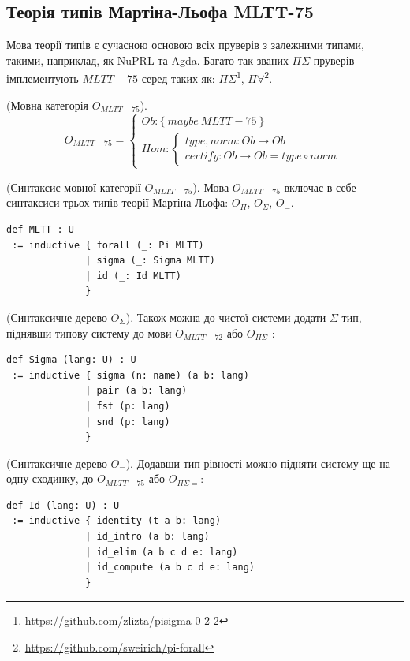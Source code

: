 \newpage
\subsection{Теорія типів Мартіна-Льофа MLTT-75}
Мова теорії типів є сучасною основою всіх пруверів з залежними типами,
такими, наприклад, як NuPRL та Agda. Багато так званих $\Pi\Sigma$ пруверів
імплементують $MLTT-75$ серед таких як:
$\Pi\Sigma$\footnote{\url{https://github.com/zlizta/pisigma-0-2-2}},
$\Pi\forall$\footnote{\url{https://github.com/sweirich/pi-forall}}.

\begin{definition} (Мовна категорія $O_{MLTT-75}$).
\begin{equation}
O_{MLTT-75} =
\begin{cases}
Ob: \{\ maybe\ MLTT-75\ \} \\
Hom: \begin{cases}
type,norm: Ob \rightarrow Ob \\
certify: Ob \rightarrow Ob = type \circ norm
\end{cases}
\end{cases}
\end{equation}
\end{definition}

\begin{definition} (Синтаксис мовної категорії $O_{MLTT-75}$).
Мова $O_{MLTT-75}$ включає в себе синтаксиси трьох типів
теорії Мартіна-Льофа: $O_\Pi$, $O_\Sigma$, $O_=$.
\begin{lstlisting}[mathescape=true]
def MLTT : U
 := inductive { forall (_: Pi MLTT)
              | sigma (_: Sigma MLTT)
              | id (_: Id MLTT)
              }
\end{lstlisting}
\end{definition}

\begin{definition} (Синтаксичне дерево $O_\Sigma$).
Також можна до чистої системи додати $\Sigma$-тип,
піднявши типову систему до мови $O_{MLTT-72}$ або $O_{\Pi\Sigma}$ :
\begin{lstlisting}[mathescape=true]
def Sigma (lang: U) : U
 := inductive { sigma (n: name) (a b: lang)
              | pair (a b: lang)
              | fst (p: lang)
              | snd (p: lang)
              }
\end{lstlisting}
\end{definition}

\begin{definition} (Синтаксичне дерево $O_=$).
Додавши тип рівності можно підняти систему ще на одну сходинку,
до $O_{MLTT-75}$ або $O_{\Pi\Sigma=}$:
\begin{lstlisting}[mathescape=true]
def Id (lang: U) : U
 := inductive { identity (t a b: lang)
              | id_intro (a b: lang)
              | id_elim (a b c d e: lang)
              | id_compute (a b c d e: lang)
              }
\end{lstlisting}
\end{definition}

